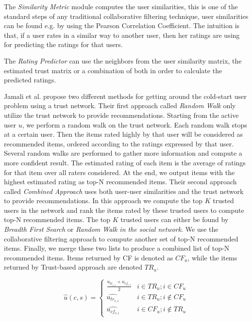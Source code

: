 The \emph{Similarity Metric} module computes the user similarities, this is one
of the standard steps of any traditional collaborative filtering technique,
user similarities can be found e.g. by using the Pearson Correlation
Coefficient. The intuition is that, if a user rates in a similar way to another
user, then her ratings are using for predicting the ratings for that users.

The \emph{Rating Predictor} can use the neighbors from the user similarity
matrix, the estimated trust matrix or a combination of both in order to
calculate the predicted ratings.



Jamali et al. \cite{Jamali2009} propose two different methods for getting
around the cold-start user problem using a trust network. Their first approach
called \emph{Random Walk} only utilize the trust network to provide
recommendations. Starting from the active user $u$, we perform a random walk on
the trust network. Each random walk stops at a certain user. Then the items
rated highly by that user will be considered as recommended items, ordered
according to the ratings expressed by that user. Several random walks are
performed to gather more information and compute a more confident result. The
estimated rating of each item is the average of ratings for that item over all
raters considered. At the end, we output items with the highest estimated
rating as top-N recommended items. Their second approach called \emph{Combined
Approach} uses both user-user similarities and the trust network to provide
recommendations. In this approach we compute the top $K$ trusted users in the
network and rank the items rated by these trusted users to compute top-N
recommended items. The top $K$ trusted users can either be found by
\emph{Breadth First Search} or \emph{Random Walk in the social network}. We use
the collaborative filtering approach to compute another set of top-N
recommended items. Finally, we merge these two lists to produce a combined list
of top-N recommended items. Items returned by CF is denoted as $CF_{u}$, while
the items returned by Trust-based approach are denoted $TR_{u}$.

\begin{equation}
 \hat{u}(c,s) =
  \begin{cases}
   \frac{u_{tr_{c,i}}+u_{cf_{c,i}}}{2}     & i \in TR_{u};i \in CF_{u}         \\
   \hat{u_{tr_{c,i}}}                      & i \in TR_{u};i \not \in CF_{u}    \\
   \hat{u_{cf_{c,i}}}                      & i \in CF_{u};i \not \in TR_{u} 	\end{cases}
\end{equation}

